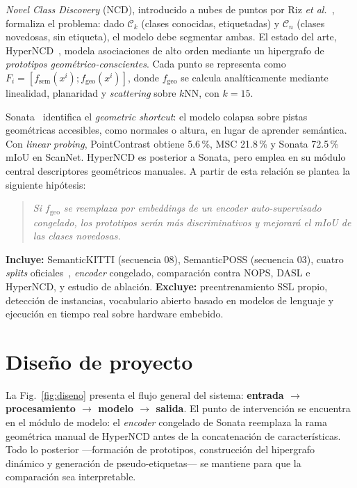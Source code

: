 \documentclass[9pt,twocolumn,a4paper]{extarticle}
\begin{document}
\emph{Novel Class Discovery} (NCD), introducido a nubes de puntos por Riz
\emph{et al.}~\cite{nops}, formaliza el problema: dado $\mathcal{C}_k$
(clases conocidas, etiquetadas) y $\mathcal{C}_n$ (clases novedosas, sin
etiqueta), el modelo debe segmentar ambas. El estado del arte,
HyperNCD~\cite{hyperncd}, modela asociaciones de alto orden mediante un
hipergrafo de \emph{prototipos geométrico-conscientes}. Cada punto se
representa como
$F_i=[f_{\mathrm{sem}}(x^i);f_{\mathrm{geo}}(x^i)]$, donde
$f_{\mathrm{geo}}$ se calcula analíticamente mediante linealidad,
planaridad y \emph{scattering} sobre $k$NN, con $k=15$.

Sonata~\cite{sonata} identifica el \emph{geometric shortcut}: el modelo
colapsa sobre pistas geométricas accesibles, como normales o altura, en lugar
de aprender semántica. Con \emph{linear probing}, PointContrast obtiene
5.6\,\%, MSC 21.8\,\% y Sonata 72.5\,\% mIoU en ScanNet. HyperNCD es posterior
a Sonata, pero emplea en su módulo central descriptores geométricos manuales.
A partir de esta relación se plantea la siguiente hipótesis:

\begin{quotation}
\noindent\footnotesize\itshape
Si $f_{\mathrm{geo}}$ se reemplaza por \emph{embeddings} de un
\emph{encoder} auto-supervisado congelado, los prototipos serán más
discriminativos y mejorará el mIoU de las clases novedosas.
\end{quotation}

\textbf{Incluye:} SemanticKITTI (secuencia 08), SemanticPOSS (secuencia 03),
cuatro \emph{splits} oficiales~\cite{nops,dasl}, \emph{encoder} congelado,
comparación contra NOPS, DASL e HyperNCD, y estudio de ablación.
\textbf{Excluye:} preentrenamiento SSL propio, detección de instancias,
vocabulario abierto basado en modelos de lenguaje y ejecución en tiempo real
sobre hardware embebido.

\section{Diseño de proyecto}
La Fig.~\ref{fig:diseno} presenta el flujo general del sistema:
\textbf{entrada $\rightarrow$ procesamiento $\rightarrow$ modelo
$\rightarrow$ salida}. El punto de intervención se encuentra en el módulo de
modelo: el \emph{encoder} congelado de Sonata reemplaza la rama geométrica
manual de HyperNCD antes de la concatenación de características. Todo lo
posterior ---formación de prototipos, construcción del hipergrafo dinámico y
generación de pseudo-etiquetas--- se mantiene para que la comparación sea
interpretable.
\end{document}
